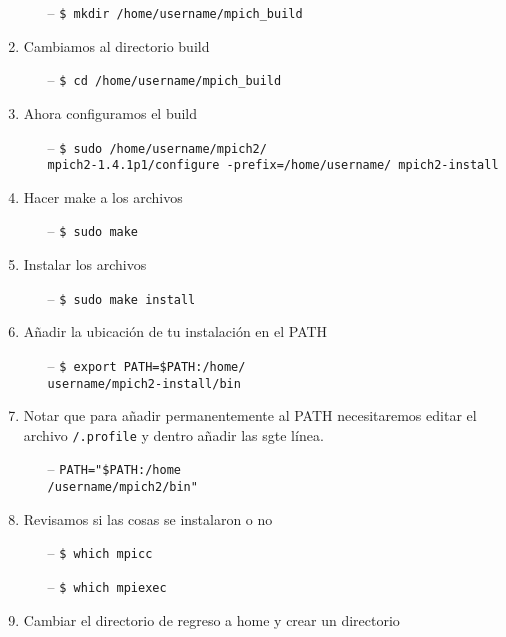 \documentclass[conference]{IEEEtran}
\begin{document}
\begin{enumerate}
  \begin{itemize}
  \item[--] \texttt{\$ mkdir /home/username/mpich\_build}
  \end{itemize}
\item Cambiamos al directorio build
  \begin{itemize}
  \item[--] \texttt{\$ cd /home/username/mpich\_build}
  \end{itemize}
\item Ahora configuramos el build
  \begin{itemize}
  \item[--] \texttt{\$ sudo /home/username/mpich2/\\mpich2-1.4.1p1/configure -prefix=/home/username/
mpich2-install}
  \end{itemize}
\item Hacer make a los archivos
  \begin{itemize}
  \item[--] \texttt{\$ sudo make}
  \end{itemize}
\item Instalar los archivos
  \begin{itemize}
  \item[--] \texttt{\$ sudo make install}
  \end{itemize}
\item Añadir la ubicación de tu instalación en el PATH
  \begin{itemize}
  \item[--] \texttt{\$ export PATH=\$PATH:/home/\\username/mpich2-install/bin}
  \end{itemize}
\item Notar que para añadir permanentemente al PATH necesitaremos editar
el archivo \texttt{\texttildelow/.profile} y dentro añadir las sgte línea.
  \begin{itemize}
  \item[--] \texttt{PATH="\$PATH:/home\\/username/mpich2/bin"}
  \end{itemize}
\item Revisamos si las cosas se instalaron o no
  \begin{itemize}
  \item[--] \texttt{\$ which mpicc}
  \item[--] \texttt{\$ which mpiexec}
  \end{itemize}
\item Cambiar el directorio de regreso a home y crear un directorio

\end{enumerate}
\end{document}
